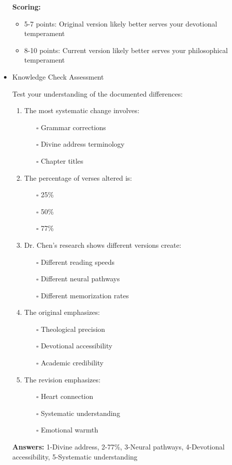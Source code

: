 \documentclass[11pt,twoside]{book}
\begin{document}
\begin{itemize}
\textbf{\textbf{Scoring:}}
\begin{itemize}
\item 5-7 points: Original version likely better serves your devotional temperament
\item 8-10 points: Current version likely better serves your philosophical temperament
\end{itemize}
\item Knowledge Check Assessment
\label{sec:org2ba6f9f}

Test your understanding of the documented differences:

\begin{enumerate}
\item The most systematic change involves:
\begin{itemize}
\item[{$\square$}] Grammar corrections
\item[{$\square$}] Divine address terminology
\item[{$\square$}] Chapter titles
\end{itemize}

\item The percentage of verses altered is:
\begin{itemize}
\item[{$\square$}] 25\%
\item[{$\square$}] 50\%
\item[{$\square$}] 77\%
\end{itemize}

\item Dr. Chen's research shows different versions create:
\begin{itemize}
\item[{$\square$}] Different reading speeds
\item[{$\square$}] Different neural pathways
\item[{$\square$}] Different memorization rates
\end{itemize}

\item The original emphasizes:
\begin{itemize}
\item[{$\square$}] Theological precision
\item[{$\square$}] Devotional accessibility
\item[{$\square$}] Academic credibility
\end{itemize}

\item The revision emphasizes:
\begin{itemize}
\item[{$\square$}] Heart connection
\item[{$\square$}] Systematic understanding
\item[{$\square$}] Emotional warmth
\end{itemize}
\end{enumerate}

\textbf{\textbf{Answers:}} 1-Divine address, 2-77\%, 3-Neural pathways, 4-Devotional accessibility, 5-Systematic understanding
\end{itemize}
\end{document}
